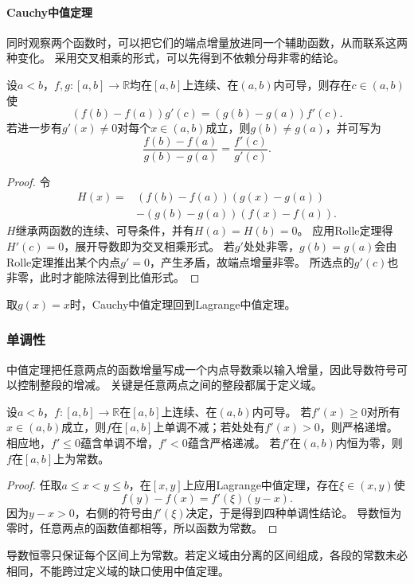 \paragraph{Cauchy中值定理}
同时观察两个函数时，可以把它们的端点增量放进同一个辅助函数，从而联系这两种变化。
采用交叉相乘的形式，可以先得到不依赖分母非零的结论。
\begin{theorem}[Cauchy中值定理]
\label{thm:analysis-cauchy-mean-value}
设$a<b$，$f,g:[a,b]\to\mathbb R$均在$[a,b]$上连续、在$(a,b)$内可导，则存在$c\in(a,b)$使
\[
 (f(b)-f(a))g'(c)=(g(b)-g(a))f'(c).
\]
若进一步有$g'(x)\neq0$对每个$x\in(a,b)$成立，则$g(b)\neq g(a)$，并可写为
\[
 \frac{f(b)-f(a)}{g(b)-g(a)}=\frac{f'(c)}{g'(c)}.
\]
\end{theorem}
\begin{proof}
令
\[
 \begin{aligned}
 H(x)={}&(f(b)-f(a))(g(x)-g(a))\\
        &-(g(b)-g(a))(f(x)-f(a)).
 \end{aligned}
\]
$H$继承两函数的连续、可导条件，并有$H(a)=H(b)=0$。
应用Rolle定理得$H'(c)=0$，展开导数即为交叉相乘形式。
若$g'$处处非零，$g(b)=g(a)$会由Rolle定理推出某个内点$g'=0$，产生矛盾，故端点增量非零。
所选点的$g'(c)$也非零，此时才能除法得到比值形式。
\end{proof}
取$g(x)=x$时，Cauchy中值定理回到Lagrange中值定理。

\subsubsection{单调性}

中值定理把任意两点的函数增量写成一个内点导数乘以输入增量，因此导数符号可以控制整段的增减。
关键是任意两点之间的整段都属于定义域。
\begin{theorem}[导数符号与单调性]
\label{thm:analysis-derivative-monotonicity}
设$a<b$，$f:[a,b]\to\mathbb R$在$[a,b]$上连续、在$(a,b)$内可导。
若$f'(x)\geq0$对所有$x\in(a,b)$成立，则$f$在$[a,b]$上单调不减；若处处有$f'(x)>0$，则严格递增。
相应地，$f'\leq0$蕴含单调不增，$f'<0$蕴含严格递减。
若$f'$在$(a,b)$内恒为零，则$f$在$[a,b]$上为常数。
\end{theorem}
\begin{proof}
任取$a\leq x<y\leq b$，在$[x,y]$上应用Lagrange中值定理，存在$\xi\in(x,y)$使
\[
 f(y)-f(x)=f'(\xi)(y-x).
\]
因为$y-x>0$，右侧的符号由$f'(\xi)$决定，于是得到四种单调性结论。
导数恒为零时，任意两点的函数值都相等，所以函数为常数。
\end{proof}
导数恒零只保证每个区间上为常数。若定义域由分离的区间组成，各段的常数未必相同，不能跨过定义域的缺口使用中值定理。

